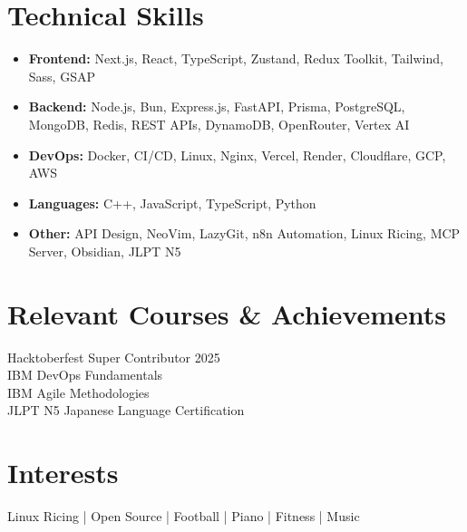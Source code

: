 \documentclass[a4paper,10pt]{article}
\begin{document}
\section*{Technical Skills}
\begin{itemize}[leftmargin=0.15in]
    \item \textbf{Frontend:} Next.js, React, TypeScript, Zustand, Redux Toolkit, Tailwind, Sass, GSAP
    \item \textbf{Backend:} Node.js, Bun, Express.js, FastAPI, Prisma, PostgreSQL, MongoDB, Redis, REST APIs, DynamoDB, OpenRouter, Vertex AI
    \item \textbf{DevOps:} Docker, CI/CD, Linux, Nginx, Vercel, Render, Cloudflare, GCP, AWS
    \item \textbf{Languages:} C++, JavaScript, TypeScript, Python
    \item \textbf{Other:} API Design, NeoVim, LazyGit, n8n Automation, Linux Ricing, MCP Server, Obsidian, JLPT N5
\end{itemize}

\section*{Relevant Courses \& Achievements}
Hacktoberfest Super Contributor 2025 \\
IBM DevOps Fundamentals \\
IBM Agile Methodologies \\
JLPT N5 Japanese Language Certification

\section*{Interests}
Linux Ricing | Open Source | Football | Piano | Fitness | Music
\end{document}
